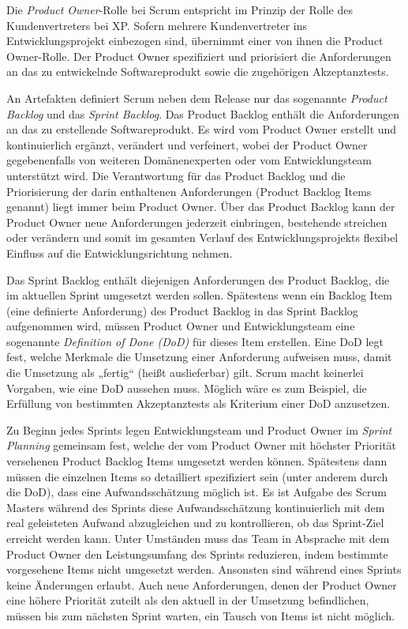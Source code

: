 
Die \textit{Product Owner}-Rolle 
bei Scrum entspricht im Prinzip der Rolle des Kunden\-vertreters bei XP. Sofern mehrere Kundenvertreter ins Entwicklungsprojekt einbezogen sind, übernimmt einer von ihnen die Product Owner-Rolle. Der Product \mbox{Owner} spezifiziert und priorisiert die Anforderungen an das zu entwickelnde Software\-produkt sowie die zugehörigen Akzeptanztests.


An Artefakten definiert Scrum neben dem Release nur das sogenannte 
\textit{Product Backlog} und das \textit{Sprint Backlog}. Das Product Backlog enthält die Anforderungen an das zu erstellende Softwareprodukt. Es wird vom Product Owner erstellt und kontinuierlich ergänzt, verändert und verfeinert, wobei der Product Owner gegebenenfalls von weiteren Domänenexperten oder vom Entwicklungsteam unterstützt wird. Die Verantwortung für das Product Backlog und die Priorisierung der darin enthaltenen Anforderungen (Product Backlog Items genannt) liegt immer beim Product Owner. Über das Product Backlog kann der Product Owner neue Anforderungen jederzeit einbringen, bestehende streichen oder verändern und somit im gesamten Verlauf des Entwicklungsprojekts flexibel Einfluss auf die Entwicklungsrichtung nehmen. 

Das Sprint Backlog enthält diejenigen Anforderungen des Product Backlog, die im aktuellen Sprint umgesetzt werden sollen. Spätestens wenn ein Backlog Item (eine definierte Anforderung) des Product Backlog in das Sprint Backlog aufgenommen wird, müssen Product Owner und Entwicklungsteam eine sogenannte 
\textit{Definition of Done (DoD)}  
für dieses Item erstellen. Eine DoD legt fest, welche Merkmale die Umsetzung einer Anforderung aufweisen muss, damit die Umsetzung als „fertig“ (heißt auslieferbar) gilt. Scrum macht keinerlei Vorgaben, wie eine DoD aussehen muss. Möglich wäre es zum Beispiel, die Erfüllung von bestimmten Akzeptanztests als Kriterium einer DoD anzusetzen.

Zu Beginn jedes Sprints legen Entwicklungsteam und Product Owner im 
\textit{Sprint Planning} gemeinsam fest, welche der vom Product Owner mit höchster Priorität versehenen Product Backlog Items umgesetzt werden können. Spätestens dann müssen die einzelnen Items so detailliert spezifiziert sein (unter anderem durch die DoD), dass eine Aufwandsschätzung möglich ist. Es ist Aufgabe des Scrum Masters während des Sprints diese Aufwandsschätzung kontinuierlich mit dem real geleisteten Aufwand abzugleichen und zu kontrollieren, ob das Sprint-Ziel erreicht werden kann. Unter Umständen muss das Team in Absprache mit dem Product Owner den Leistungsumfang des Sprints reduzieren, indem bestimmte vorgesehene Items nicht umgesetzt werden. Ansonsten sind während eines Sprints keine Änderungen erlaubt. Auch neue Anforderungen, denen der Product Owner eine höhere Priorität zuteilt als den aktuell in der Umsetzung befindlichen, müssen bis zum nächsten Sprint warten, ein Tausch von Items ist nicht möglich. 

